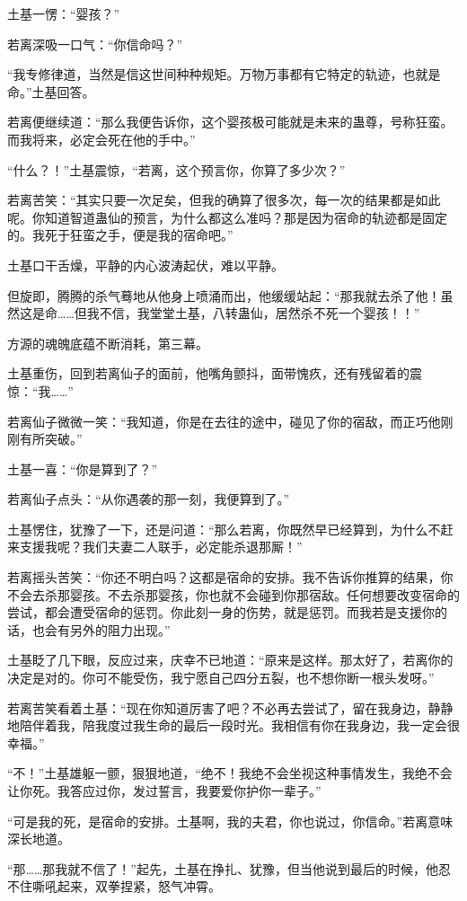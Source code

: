 \begin{this_body}
土基一愣：“婴孩？”

若离深吸一口气：“你信命吗？”

“我专修律道，当然是信这世间种种规矩。万物万事都有它特定的轨迹，也就是命。”土基回答。

若离便继续道：“那么我便告诉你，这个婴孩极可能就是未来的蛊尊，号称狂蛮。而我将来，必定会死在他的手中。”

“什么？！”土基震惊，“若离，这个预言你，你算了多少次？”

若离苦笑：“其实只要一次足矣，但我的确算了很多次，每一次的结果都是如此呢。你知道智道蛊仙的预言，为什么都这么准吗？那是因为宿命的轨迹都是固定的。我死于狂蛮之手，便是我的宿命吧。”

土基口干舌燥，平静的内心波涛起伏，难以平静。

但旋即，腾腾的杀气蓦地从他身上喷涌而出，他缓缓站起：“那我就去杀了他！虽然这是命……但我不信，我堂堂土基，八转蛊仙，居然杀不死一个婴孩！！”

方源的魂魄底蕴不断消耗，第三幕。

土基重伤，回到若离仙子的面前，他嘴角颤抖，面带愧疚，还有残留着的震惊：“我……”

若离仙子微微一笑：“我知道，你是在去往的途中，碰见了你的宿敌，而正巧他刚刚有所突破。”

土基一喜：“你是算到了？”

若离仙子点头：“从你遇袭的那一刻，我便算到了。”

土基愣住，犹豫了一下，还是问道：“那么若离，你既然早已经算到，为什么不赶来支援我呢？我们夫妻二人联手，必定能杀退那厮！”

若离摇头苦笑：“你还不明白吗？这都是宿命的安排。我不告诉你推算的结果，你不会去杀那婴孩。不去杀那婴孩，你也就不会碰到你那宿敌。任何想要改变宿命的尝试，都会遭受宿命的惩罚。你此刻一身的伤势，就是惩罚。而我若是支援你的话，也会有另外的阻力出现。”

土基眨了几下眼，反应过来，庆幸不已地道：“原来是这样。那太好了，若离你的决定是对的。你可不能受伤，我宁愿自己四分五裂，也不想你断一根头发呀。”

若离苦笑看着土基：“现在你知道厉害了吧？不必再去尝试了，留在我身边，静静地陪伴着我，陪我度过我生命的最后一段时光。我相信有你在我身边，我一定会很幸福。”

“不！”土基雄躯一颤，狠狠地道，“绝不！我绝不会坐视这种事情发生，我绝不会让你死。我答应过你，发过誓言，我要爱你护你一辈子。”

“可是我的死，是宿命的安排。土基啊，我的夫君，你也说过，你信命。”若离意味深长地道。

“那……那我就不信了！”起先，土基在挣扎、犹豫，但当他说到最后的时候，他忍不住嘶吼起来，双拳捏紧，怒气冲霄。


\end{this_body}
